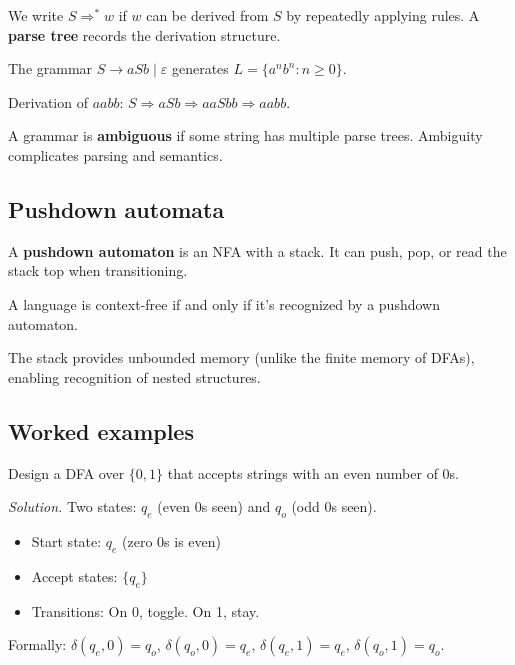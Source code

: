 \begin{definition}[Derivation]
We write $S \Rightarrow^* w$ if $w$ can be derived from $S$ by repeatedly applying rules.
A \textbf{parse tree} records the derivation structure.
\end{definition}

\begin{example}
The grammar $S \to aSb \mid \varepsilon$ generates $L = \{a^n b^n : n \geq 0\}$.

Derivation of $aabb$: $S \Rightarrow aSb \Rightarrow aaSbb \Rightarrow aabb$.
\end{example}

\begin{remark}
A grammar is \textbf{ambiguous} if some string has multiple parse trees. Ambiguity complicates parsing and semantics.
\end{remark}

\subsection*{Pushdown automata}

\begin{definition}
A \textbf{pushdown automaton} is an NFA with a stack. It can push, pop, or read the stack top when transitioning.
\end{definition}

\begin{theorem}
A language is context-free if and only if it's recognized by a pushdown automaton.
\end{theorem}

The stack provides unbounded memory (unlike the finite memory of DFAs), enabling recognition of nested structures.

\subsection*{Worked examples}

\begin{example}
Design a DFA over $\{0, 1\}$ that accepts strings with an even number of 0s.

\emph{Solution.} Two states: $q_e$ (even 0s seen) and $q_o$ (odd 0s seen).
\begin{itemize}
  \item Start state: $q_e$ (zero 0s is even)
  \item Accept states: $\{q_e\}$
  \item Transitions: On 0, toggle. On 1, stay.
\end{itemize}

Formally: $\delta(q_e, 0) = q_o$, $\delta(q_o, 0) = q_e$, $\delta(q_e, 1) = q_e$, $\delta(q_o, 1) = q_o$.
\end{example}

